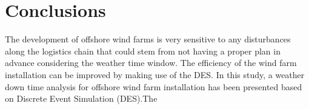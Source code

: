 \section{Conclusions}
The development of offshore wind farms is very sensitive to any disturbances along the logistics chain that could stem from not having a proper plan in advance considering the weather time window. The efficiency of the wind farm installation can be improved by making use of the DES.
In this study, a weather down time analysis for offshore wind farm installation  has been presented based on Discrete Event Simulation (DES).The 
